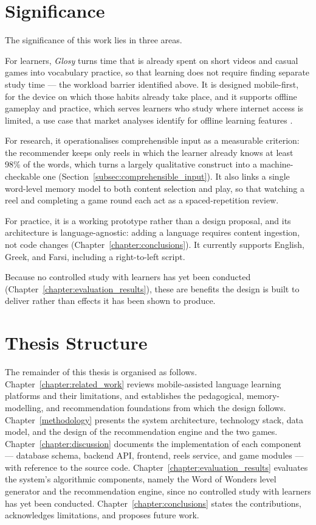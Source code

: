 \section{Significance}
    The significance of this work lies in three areas.

    For learners, \textit{Glosy} turns time that is already spent on short videos and casual games into vocabulary practice, so that learning does not require finding separate study time --- the workload barrier identified above. It is designed mobile-first, for the device on which those habits already take place, and it supports offline gameplay and practice, which serves learners who study where internet access is limited, a use case that market analyses identify for offline learning features \cite{businessresearch2026languageapps}.

    For research, it operationalises comprehensible input as a measurable criterion: the recommender keeps only reels in which the learner already knows at least 98\% of the words, which turns a largely qualitative construct into a machine-checkable one (Section~\ref{subsec:comprehensible_input}). It also links a single word-level memory model to both content selection and play, so that watching a reel and completing a game round each act as a spaced-repetition review.

    For practice, it is a working prototype rather than a design proposal, and its architecture is language-agnostic: adding a language requires content ingestion, not code changes (Chapter~\ref{chapter:conclusions}). It currently supports English, Greek, and Farsi, including a right-to-left script.

    Because no controlled study with learners has yet been conducted (Chapter~\ref{chapter:evaluation_results}), these are benefits the design is built to deliver rather than effects it has been shown to produce.

\section{Thesis Structure}
The remainder of this thesis is organised as follows. Chapter~\ref{chapter:related_work} reviews mobile-assisted language learning platforms and their limitations, and establishes the pedagogical, memory-modelling, and recommendation foundations from which the design follows. Chapter~\ref{methodology} presents the system architecture, technology stack, data model, and the design of the recommendation engine and the two games. Chapter~\ref{chapter:discussion} documents the implementation of each component --- database schema, backend API, frontend, reels service, and game modules --- with reference to the source code. Chapter~\ref{chapter:evaluation_results} evaluates the system's algorithmic components, namely the Word of Wonders level generator and the recommendation engine, since no controlled study with learners has yet been conducted. Chapter~\ref{chapter:conclusions} states the contributions, acknowledges limitations, and proposes future work.

\newpage